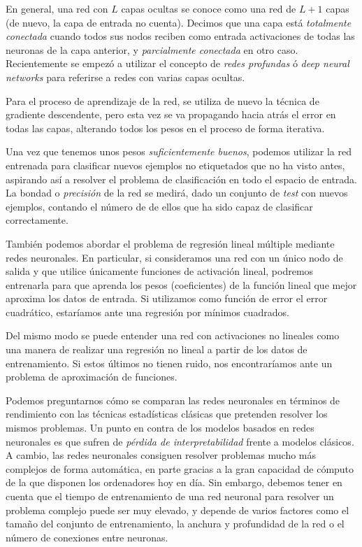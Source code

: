 \documentclass[
  a4paper,
  12pt,
  spanish,
]{scrartcl}
\theoremstyle{teorema-style}
\begin{document}
En general, una red con $L$ capas ocultas se conoce como una red de $L+1$ capas (de nuevo, la capa de entrada no cuenta). Decimos que una capa está \textit{totalmente conectada} cuando todos sus nodos reciben como entrada activaciones de todas las neuronas de la capa anterior, y \textit{parcialmente conectada} en otro caso. Recientemente se empezó a utilizar el concepto de \textit{redes profundas} ó \textit{deep neural networks} para referirse a redes con varias capas ocultas.

Para el proceso de aprendizaje de la red, se utiliza de nuevo la técnica de gradiente descendente, pero esta vez se va propagando hacia atrás el error en todas las capas, alterando todos los pesos en el proceso de forma iterativa.

Una vez que tenemos unos pesos \textit{suficientemente buenos}, podemos utilizar la red entrenada para clasificar nuevos ejemplos no etiquetados que no ha visto antes, aspirando así a resolver el problema de clasificación en todo el espacio de entrada. La bondad o \textit{precisión} de la red se medirá, dado un conjunto de \textit{test} con nuevos ejemplos, contando el número de de ellos que ha sido capaz de clasificar correctamente.

También podemos abordar el problema de regresión lineal múltiple mediante redes neuronales. En particular, si consideramos una red con un único nodo de salida y que utilice únicamente funciones de activación lineal, podremos entrenarla para que aprenda los pesos (coeficientes) de la función lineal que mejor aproxima los datos de entrada. Si utilizamos como función de error el error cuadrático, estaríamos ante una regresión por mínimos cuadrados.

Del mismo modo se puede entender una red con activaciones no lineales como una manera de realizar una regresión no lineal a partir de los datos de entrenamiento. Si estos últimos no tienen ruido, nos encontraríamos ante un problema de aproximación de funciones.

Podemos preguntarnos cómo se comparan las redes neuronales en términos de rendimiento con las técnicas estadísticas clásicas que pretenden resolver los mismos problemas. Un punto en contra de los modelos basados en redes neuronales es que sufren de \textit{pérdida de interpretabilidad} frente a modelos clásicos. A cambio, las redes neuronales consiguen resolver problemas mucho más complejos de forma automática, en parte gracias a la gran capacidad de cómputo de la que disponen los ordenadores hoy en día. Sin embargo, debemos tener en cuenta que el tiempo de entrenamiento de una red neuronal para resolver un problema complejo puede ser muy elevado, y depende de varios factores como el tamaño del conjunto de entrenamiento, la anchura y profundidad de la red o el número de conexiones entre neuronas.
\end{document}
